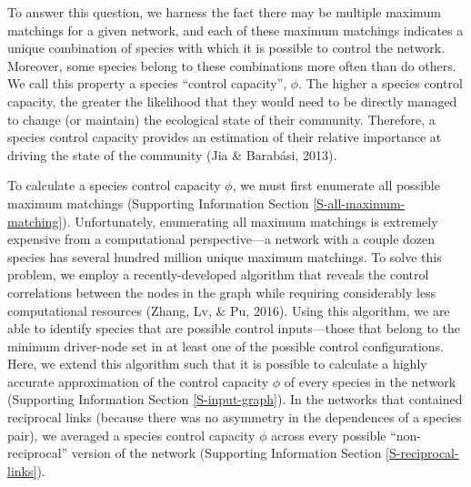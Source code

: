 \documentclass[a4paper]{artikel1}
\theoremstyle{definition}
\theoremstyle{definition}
\theoremstyle{definition}
\theoremstyle{remark}
\begin{document}
To answer this question, we harness the fact there may be multiple
maximum matchings for a given network, and each of these maximum
matchings indicates a unique combination of species with which it is
possible to control the network. Moreover, some species belong to these
combinations more often than do others. We call this property a species
``control capacity'', \(\phi\). The higher a species control capacity,
the greater the likelihood that they would need to be directly managed
to change (or maintain) the ecological state of their community.
Therefore, a species control capacity provides an estimation of their
relative importance at driving the state of the community (Jia \&
Barabási, 2013).

To calculate a species control capacity \(\phi\), we must first
enumerate all possible maximum matchings (Supporting Information Section
\ref{S-all-maximum-matching}). Unfortunately, enumerating all maximum
matchings is extremely expensive from a computational perspective---a
network with a couple dozen species has several hundred million unique
maximum matchings. To solve this problem, we employ a recently-developed
algorithm that reveals the control correlations between the nodes in the
graph while requiring considerably less computational resources (Zhang,
Lv, \& Pu, 2016). Using this algorithm, we are able to identify species
that are possible control inputs---those that belong to the minimum
driver-node set in at least one of the possible control configurations.
Here, we extend this algorithm such that it is possible to calculate a
highly accurate approximation of the control capacity \(\phi\) of every
species in the network (Supporting Information Section
\ref{S-input-graph}). In the networks that contained reciprocal links
(because there was no asymmetry in the dependences of a species pair),
we averaged a species control capacity \(\phi\) across every possible
``non-reciprocal'' version of the network (Supporting Information
Section \ref{S-reciprocal-links}).
\end{document}
